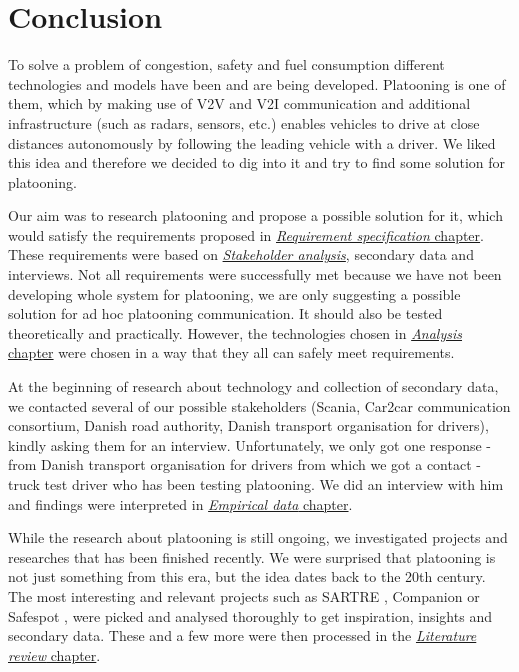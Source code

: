 \section{Conclusion}\label{sec:conclusion}
%
To solve a problem of congestion, safety and fuel consumption different technologies and models have been and are being developed. Platooning is one of them, which by making use of \acrshort{V2V} and \acrshort{V2I} communication and additional infrastructure (such as radars, sensors, etc.) enables vehicles to drive at close distances autonomously by following the leading vehicle with a driver. We liked this idea and therefore we decided to dig into it and try to find some solution for platooning.\par
%
Our aim was to research platooning and propose a possible solution for it, which would satisfy the requirements proposed in \hyperref[sec:requirements]{\textit{Requirement specification} chapter}. These requirements were based on \hyperref[sec:stakeholders]{\textit{Stakeholder analysis}}, secondary data and interviews. Not all requirements were successfully met because we have not been developing whole system for platooning, we are only suggesting a possible solution for ad hoc platooning communication. It should also be tested theoretically and practically. However, the technologies chosen in \hyperref[sec:analysis]{\textit{Analysis} chapter} were chosen in a way that they all can safely meet requirements.\par
%
At the beginning of research about technology and collection of secondary data, we contacted several of our possible stakeholders (Scania, Car2car communication consortium, Danish road authority, Danish transport organisation for drivers), kindly asking them for an interview. Unfortunately, we only got one response - from Danish transport organisation for drivers from which we got a contact - truck test driver who has been testing platooning. We did an interview with him and findings were interpreted in \hyperref[sec:data]{\textit{Empirical data} chapter}.\par
%
While the research about platooning is still ongoing, we investigated projects and researches that has been finished recently. We were surprised that platooning is not just something from this era, but the idea dates back to the 20th century. The most interesting and relevant projects such as SARTRE \cite{Chan2012ProjectSARTRE}, Companion \cite{2016CompanionProject} or Safespot \cite{Safespot}, were picked and analysed thoroughly to get inspiration, insights and secondary data. These and a few more were then processed in the \hyperref[sec:literature]{\textit{Literature review} chapter}.\par
